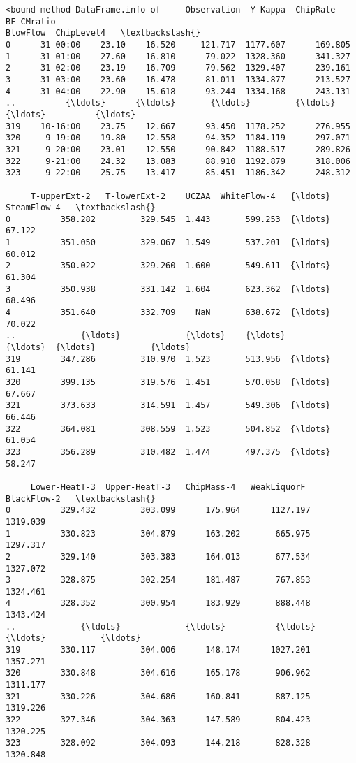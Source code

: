 \documentclass[11pt]{article}
\makeatletter
\newcommand{\boxspacing}{\kern\kvtcb@left@rule\kern\kvtcb@boxsep}
\newcommand{\prompt}[4]{
        {\ttfamily\llap{{\color{#2}[#3]:\hspace{3pt}#4}}\vspace{-\baselineskip}}
    }
\makeatother
\begin{document}
            \begin{tcolorbox}[breakable, size=fbox, boxrule=.5pt, pad at break*=1mm, opacityfill=0]
\prompt{Out}{outcolor}{5}{\boxspacing}
\begin{Verbatim}[commandchars=\\\{\}]
<bound method DataFrame.info of     Observation  Y-Kappa  ChipRate  BF-CMratio
BlowFlow  ChipLevel4   \textbackslash{}
0      31-00:00    23.10    16.520     121.717  1177.607      169.805
1      31-01:00    27.60    16.810      79.022  1328.360      341.327
2      31-02:00    23.19    16.709      79.562  1329.407      239.161
3      31-03:00    23.60    16.478      81.011  1334.877      213.527
4      31-04:00    22.90    15.618      93.244  1334.168      243.131
..          {\ldots}      {\ldots}       {\ldots}         {\ldots}       {\ldots}          {\ldots}
319    10-16:00    23.75    12.667      93.450  1178.252      276.955
320     9-19:00    19.80    12.558      94.352  1184.119      297.071
321     9-20:00    23.01    12.550      90.842  1188.517      289.826
322     9-21:00    24.32    13.083      88.910  1192.879      318.006
323     9-22:00    25.75    13.417      85.451  1186.342      248.312

     T-upperExt-2   T-lowerExt-2    UCZAA  WhiteFlow-4   {\ldots}  SteamFlow-4   \textbackslash{}
0          358.282         329.545  1.443       599.253  {\ldots}        67.122
1          351.050         329.067  1.549       537.201  {\ldots}        60.012
2          350.022         329.260  1.600       549.611  {\ldots}        61.304
3          350.938         331.142  1.604       623.362  {\ldots}        68.496
4          351.640         332.709    NaN       638.672  {\ldots}        70.022
..             {\ldots}             {\ldots}    {\ldots}           {\ldots}  {\ldots}           {\ldots}
319        347.286         310.970  1.523       513.956  {\ldots}        61.141
320        399.135         319.576  1.451       570.058  {\ldots}        67.667
321        373.633         314.591  1.457       549.306  {\ldots}        66.446
322        364.081         308.559  1.523       504.852  {\ldots}        61.054
323        356.289         310.482  1.474       497.375  {\ldots}        58.247

     Lower-HeatT-3  Upper-HeatT-3   ChipMass-4   WeakLiquorF   BlackFlow-2   \textbackslash{}
0          329.432         303.099      175.964      1127.197      1319.039
1          330.823         304.879      163.202       665.975      1297.317
2          329.140         303.383      164.013       677.534      1327.072
3          328.875         302.254      181.487       767.853      1324.461
4          328.352         300.954      183.929       888.448      1343.424
..             {\ldots}             {\ldots}          {\ldots}           {\ldots}           {\ldots}
319        330.117         304.006      148.174      1027.201      1357.271
320        330.848         304.616      165.178       906.962      1311.177
321        330.226         304.686      160.841       887.125      1319.226
322        327.346         304.363      147.589       804.423      1320.225
323        328.092         304.093      144.218       828.328      1320.848


\end{Verbatim}
\end{tcolorbox}
\end{document}
